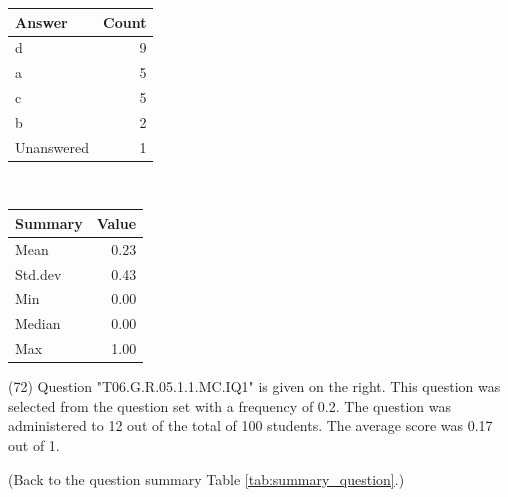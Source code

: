 \documentclass[12pt,nohyper]{tufte-handout}\usepackage[]{graphicx}\usepackage[]{color}
\begin{document}
\begin{center}%
\begin{tabular}{lr}
  \hline
Answer & Count \\ 
  \hline
d &   9 \\ 
  a &   5 \\ 
  c &   5 \\ 
  b &   2 \\ 
  Unanswered &   1 \\ 
   \hline
\end{tabular}
~~~~~~~~%
\begin{tabular}{lr}
  \hline
Summary & Value \\ 
  \hline
Mean & 0.23 \\ 
  Std.dev & 0.43 \\ 
  Min & 0.00 \\ 
  Median & 0.00 \\ 
  Max & 1.00 \\ 
   \hline
\end{tabular}
\end{center}\newpage{} (72) Question "T06.G.R.05.1.1.MC.IQ1" is given on the right. This question was selected from the question set with a frequency of 0.2. The question was administered to 12 out of the total of 100 students. The average score was 0.17 out of 1.

 (Back to the question summary Table \ref{tab:summary_question}.)
\end{document}
